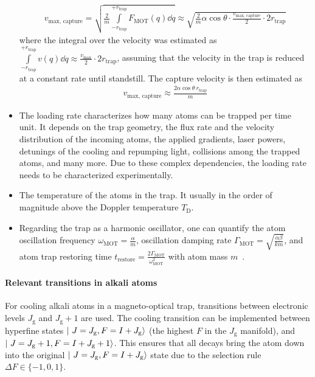 \begin{itemize}
    \begin{align}
            v_\text{max, capture} 
            = \sqrt{\frac{2}{m} \int\limits_{-r_\text{trap}}^{+r_\text{trap}} F_\text{MOT}(q) \dd{q}} 
            \approx \sqrt{\frac{2}{m} \alpha \cos \theta \cdot \frac{v_\text{max, capture}}{2} \cdot 2r_\text{trap}}
    \end{align}
    where the integral over the velocity was estimated as $\int\limits_{-r_\text{trap}}^{+r_\text{trap}}  v(q) \dd{q} \approx \frac{v_\text{max}}{2} \cdot 2r_\text{trap}$, assuming that the velocity in the trap is reduced at a constant rate until standstill. The capture velocity is then estimated as
    \begin{align}\label{eq:capture_velocity}
        v_\text{max, capture} \approx \frac{2 \alpha \cos \theta ~ r_\text{trap}}{m}
    \end{align}
    \item The loading rate characterizes how many atoms can be trapped per time unit. It depends on the trap geometry, the flux rate and the velocity distribution of the incoming atoms, the applied gradients, laser powers, detunings of the cooling and repumping light, collisions among the trapped atoms, and many more. Due to these complex dependencies, the loading rate needs to be characterized experimentally.
    \item The temperature of the atoms in the trap. It usually in the order of magnitude above the Doppler temperature $T_\text{D}$.
    \item Regarding the trap as a harmonic oscillator, one can quantify the atom oscillation frequency $\omega_\text{MOT} = \frac{\alpha}{m}$, oscillation damping rate $\Gamma_\text{MOT} = \sqrt{\frac{\alpha \beta}{km}}$, and atom trap restoring time $t_\text{restore} = \frac{2\Gamma_\text{MOT}}{\omega_\text{MOT}^2}$ with atom mass $m$~\cite{metcalf_laser_1999}.
\end{itemize}

\paragraph{Relevant transitions in alkali atoms}
\sloppy For cooling alkali atoms in a magneto-optical trap, transitions between electronic levels $J_\text{g}$ and $J_\text{g} + 1$ are used. The cooling transition can be imple\-mented between hyperfine states $\Ket{~J = J_\text{g}, F = I + J_\text{g}}$ (the highest $F$ in the $J_\text{g}$ manifold), and $\Ket{~J = J_\text{g} + 1, F= I + J_\text{g} + 1}$. This ensures that all decays bring the atom down into the original $\Ket{~J = J_\text{g}, F = I + J_\text{g}}$ state due to the selection rule $\Delta F \in \{-1, 0, 1\}$.

